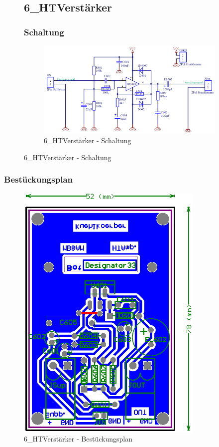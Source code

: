 \begin{figure}
	\subsection{6\_HTVerstärker}
	\subsubsection*{Schaltung}
	\begin{figure} [H]
		\centering
		\includegraphics[width=1\textwidth]{img/Print6/HTVerstaerker-Schem.png}
		\caption{6\_HTVerstärker - Schaltung}
		\label {fig:8.10.19}
	\end{figure}
\end{figure}

\subsubsection*{Bestückungsplan}
	\begin{figure} [H]
		\centering
		\includegraphics[width=0.8\textwidth]{img/Print6/HTVerstaerker-Best.png}
		\caption{6\_HTVerstärker - Bestückungsplan}
		\label {fig:8.10.20}
	\end{figure}

